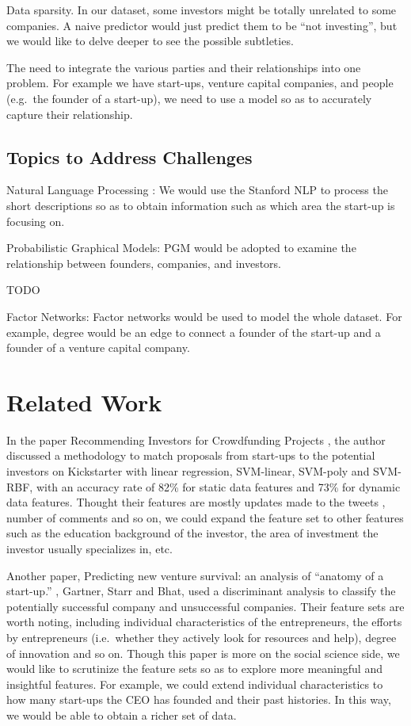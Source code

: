 Data sparsity. In our dataset, some investors might be totally unrelated
to some companies. A naive predictor would just predict them to be ``not
investing'', but we would like to delve deeper to see the possible
subtleties.

The need to integrate the various parties and their relationships into
one problem. For example we have start-ups, venture capital companies,
and people (e.g.~the founder of a start-up), we need to use a model so
as to accurately capture their relationship.

\subsection{Topics to Address
Challenges}\label{topics-to-address-challenges}

Natural Language Processing : We would use the Stanford NLP to process
the short descriptions so as to obtain information such as which area
the start-up is focusing on.

Probabilistic Graphical Models: PGM would be adopted to examine the
relationship between founders, companies, and investors.

TODO

Factor Networks: Factor networks would be used to model the whole
dataset. For example, degree would be an edge to connect a founder of
the start-up and a founder of a venture capital company.

\section{Related Work}\label{related-work}

In the paper Recommending Investors for Crowdfunding Projects
\cite{an2014recommending}, the author discussed a methodology to match
proposals from start-ups to the potential investors on Kickstarter with
linear regression, SVM-linear, SVM-poly and SVM-RBF, with an accuracy
rate of 82\% for static data features and 73\% for dynamic data
features. Thought their features are mostly updates made to the tweets ,
number of comments and so on, we could expand the feature set to other
features such as the education background of the investor, the area of
investment the investor usually specializes in, etc.

Another paper, Predicting new venture survival: an analysis of ``anatomy
of a start-up.'' \cite{gartner1999predicting}, Gartner, Starr and Bhat,
used a discriminant analysis to classify the potentially successful
company and unsuccessful companies. Their feature sets are worth noting,
including individual characteristics of the entrepreneurs, the efforts
by entrepreneurs (i.e.~whether they actively look for resources and
help), degree of innovation and so on. Though this paper is more on the
social science side, we would like to scrutinize the feature sets so as
to explore more meaningful and insightful features. For example, we
could extend individual characteristics to how many start-ups the CEO
has founded and their past histories. In this way, we would be able to
obtain a richer set of data.

